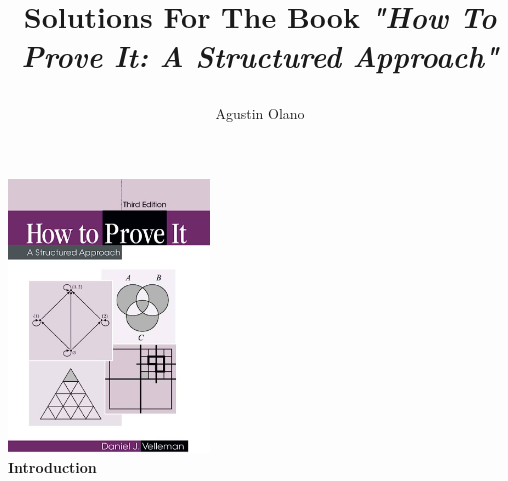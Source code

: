 \documentclass{article}
\title{\centerline{\textbf{Solutions} For The Book \textit{"How To Prove It: A Structured Approach"}}}
\author{Agustin Olano}
\date{}
\begin{document}
\maketitle
\begin{center}
    \includegraphics[width=0.4\textwidth]{htp.jpg}
    \\
    \vspace{1cm}
    \Huge{\bf Introduction}
\end{center}
\newpage
\end{document}
